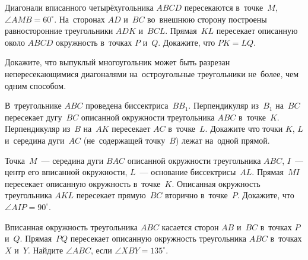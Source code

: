 \begin{problems}
\item
Диагонали вписанного четырёхугольника $ABCD$ пересекаются в~точке~$M$,
$\angle AMB = 60^{\circ}$.
На~сторонах $AD$ и~$BC$ во~внешнюю сторону построены равносторонние
треугольники $ADK$ и~$BCL$.
Прямая~$KL$ пересекает описанную около $ABCD$ окружность в~точках $P$ и~$Q$.
Докажите, что $PK = LQ$.

\item
Докажите, что выпуклый многоугольник может быть разрезан непересекающимися
диагоналями на~остроугольные треугольники не~более, чем одним способом.

\item
В~треугольнике $ABC$ проведена биссектриса~$B B_1$.
Перпендикуляр из~$B_1$ на~$BC$ пересекает дугу~$BC$ описанной окружности
треугольника $ABC$ в~точке~$K$.
Перпендикуляр из~$B$ на~$AK$ пересекает $AC$ в~точке~$L$.
Докажите что точки $K$, $L$  и~середина дуги~$AC$ (не~содержащей точку~$B$)
лежат на~одной прямой.

\item
Точка~$M$~--- середина дуги $BAC$ описанной окружности треугольника $ABC$,
$I$~--- центр его вписанной окружности, $L$~--- основание биссектрисы~$AL$.
Прямая~$MI$ пересекает описанную окружность в~точке~$K$.
Описанная окружность треугольника $AKL$ пересекает прямую~$BC$ вторично
в~точке~$P$.
Докажите, что $\angle AIP = 90^{\circ}$.

\item
Вписанная окружность треугольника $ABC$ касается сторон $AB$ и~$BC$ в~точках
$P$ и~$Q$.
Прямая~$PQ$ пересекает описанную окружность треугольника $ABC$ в~точках
$X$ и~$Y$.
Найдите $\angle ABC$, если $\angle XBY = 135^{\circ}$.

\end{problems}

